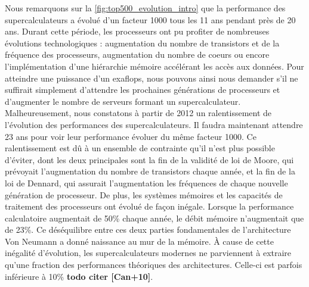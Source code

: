         Nous remarquons sur la \autoref{fig:top500_evolution_intro} que la performance des supercalculateurs a évolué d'un facteur 1000 tous les 11 ans pendant près de 20 ans. Durant cette période, les processeurs ont pu profiter de nombreuses évolutions technologiques : augmentation du nombre de transistors et de la fréquence des processeurs, augmentation du nombre de coeurs ou encore l'implémentation d'une hiérarchie mémoire accélérant les accès aux données.
        Pour atteindre une puissance d'un exaflops, nous pouvons ainsi nous demander s'il ne suffirait simplement d'attendre les prochaines générations de processeurs et d'augmenter le nombre de serveurs formant un supercalculateur. Malheureusement, nous constatons à partir de 2012 un ralentissement de l'évolution des performances des supercalculateurs. Il faudra maintenant attendre 23 ans pour voir leur performance évoluer du même facteur 1000.
        Ce ralentissement est dû à un ensemble de contrainte qu'il n'est plus possible d'éviter, dont les deux principales sont la fin de la validité de loi de Moore, qui prévoyait l'augmentation du nombre de transistors chaque année, et la fin de la loi de Dennard, qui assurait l'augmentation les fréquences de chaque nouvelle génération de processeur.  De plus, les systèmes mémoires et les capacités de traitement des processeurs ont évolué de façon inégale. Lorsque la performance calculatoire augmentait de 50\% chaque année, le débit mémoire n'augmentait que de 23\%. Ce déséquilibre entre ces deux parties fondamentales de l'architecture Von Neumann a donné naissance au mur de la mémoire. À cause de cette inégalité d'évolution, les supercalculateurs modernes ne parviennent à extraire qu'une fraction des performances théoriques des architectures. Celle-ci  est parfois inférieure à 10\% \textbf{todo citer [Can+10]}.
        
